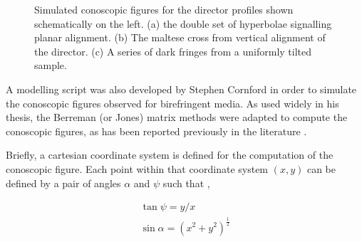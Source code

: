 \begin{figure}
\begin{center}
\end{center}
\caption[Simulated conoscopic images for planar, vertical and tilted alignment]{\label{fig:con_samples}Simulated conoscopic figures for the director profiles shown schematically on the left. (a) the double set of hyperbolae signalling planar alignment. (b) The maltese cross from vertical alignment of the director. (c) A series of dark fringes from a uniformly tilted sample.}
\end{figure}

A modelling script was also developed by Stephen Cornford \cite{Cornford2008} in order to simulate the conoscopic figures observed for birefringent media. As used widely in his thesis, the Berreman \cite{Berreman1972} (or Jones) matrix methods were adapted to compute the conoscopic figures, as has been reported previously in the literature \cite{Ogasawara2001,Parry-Jones2002}.

Briefly, a cartesian coordinate system is defined for the computation of the conoscopic figure. Each point within that coordinate system $\left(x,y\right)$ can be defined by a pair of angles $\alpha$ and $\psi$ such that \cite{Cornford2008},

\begin{eqnarray}
\tan\psi=y/x\\
\sin\alpha=\left(x^2+y^2\right)^{\frac{1}{2}}
\end{eqnarray}

